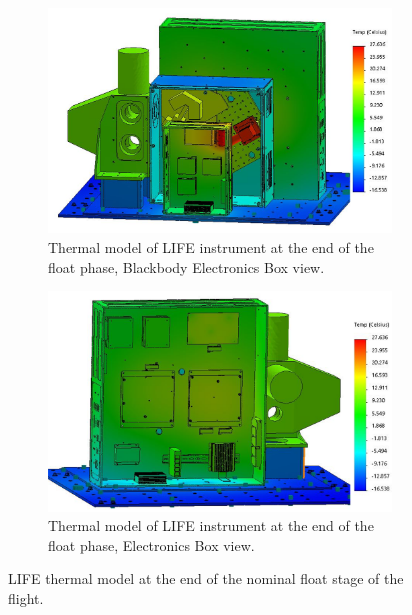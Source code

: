 \begin{figure}
    \centering
    \begin{subfigure}[h]{0.9\textwidth}
        \centering
        \includegraphics[width=\textwidth]{chap4_images/float_images/Test_16_BBEbox_FIXED.png}
        \caption{Thermal model of LIFE instrument at the end of the float phase, Blackbody Electronics Box view.}
        \label{fig:float_model_ebox}
    \end{subfigure}
    \begin{subfigure}[h]{0.9\textwidth}
        \centering
        \includegraphics[width=\textwidth]{chap4_images/float_images/Test_16_Ebox_FIXED.png}
        \caption{Thermal model of LIFE instrument at the end of the float phase, Electronics Box view.}
        \label{float_model_ebox}
    \end{subfigure}
    \caption{LIFE thermal model at the end of the nominal float stage of the flight.}
    \label{float_model}
\end{figure}

